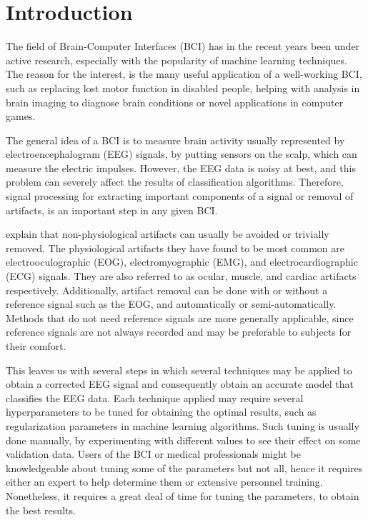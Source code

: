\section{Introduction}
The field of Brain-Computer Interfaces (BCI) has in the recent years been under active research, especially with the popularity of machine learning techniques. The reason for the interest, is the many useful application of a well-working BCI, such as replacing lost motor function in disabled people, helping with analysis in brain imaging to diagnose brain conditions or novel applications in computer games. 

The general idea of a BCI is to measure brain activity usually represented by electroencephalogram (EEG) signals, by putting sensors on the scalp, which can measure the electric impulses. However, the EEG data is noisy at best, and this problem can severely affect the results of classification algorithms. Therefore, signal processing for extracting important components of a signal or removal of artifacts, is an important step in any given BCI.

\cite{uriguen2015eeg} explain that non-physiological artifacts can usually be avoided or trivially removed. The physiological artifacts they have found to be most common are electrooculographic (EOG), electromyographic (EMG), and electrocardiographic (ECG) signals. They are also referred to as ocular, muscle, and cardiac artifacts respectively. Additionally, artifact removal can be done with or without a reference signal such as the EOG, and automatically or semi-automatically. Methods that do not need reference signals are more generally applicable, since reference signals are not always recorded and may be preferable to subjects for their comfort. 

This leaves us with several steps in which several techniques may be applied to obtain a corrected EEG signal and consequently obtain an accurate model that classifies the EEG data. Each technique applied may require several hyperparameters to be tuned for obtaining the optimal results, such as regularization parameters in machine learning algorithms. Such tuning is usually done manually, by experimenting with different values to see their effect on some validation data. Users of the BCI or medical professionals might be knowledgeable about tuning some of the parameters but not all, hence it requires either an expert to help determine them or extensive personnel training. Nonetheless, it requires a great deal of time for tuning the parameters, to obtain the best results.

